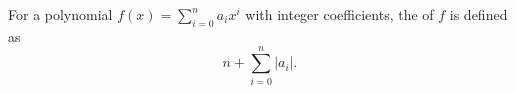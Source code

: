 For a polynomial $f(x) = \sum_{i=0}^{n} a_i x^i$ with integer coefficients, the  of $f$ is defined as
$$n + \sum_{i=0}^{n} |a_i|.$$
